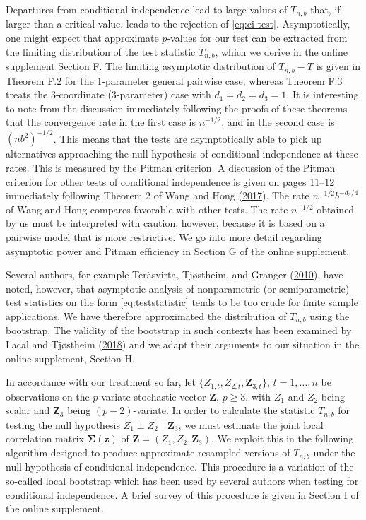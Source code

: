 \documentclass[
  12pt,
  letterpaper]{article}
\newcommand{\Z}{\bm{Z}}
\newcommand{\z}{\bm{z}}
\newcommand{\fSigma}{\bm{\Sigma}}
\theoremstyle{definition}
\theoremstyle{definition}
\theoremstyle{definition}
\theoremstyle{remark}
\begin{document}
Departures from conditional independence lead to large values of \(T_{n,b}\) that, if larger than a critical value, leads to the rejection of \eqref{eq:ci-test}. Asymptotically, one might expect that approximate \(p\)-values for our test can be extracted from the limiting distribution of the test statistic \(T_{n,b}\), which we derive in the online supplement Section F. The limiting asymptotic distribution of \(T_{n,b}-T\) is given in Theorem F.2 for the 1-parameter general pairwise case, whereas Theorem F.3 treats the 3-coordinate (3-parameter) case with \(d_1=d_2=d_3=1\). It is interesting to note from the discussion immediately following the proofs of these theorems that the convergence rate in the first case is \(n^{-1/2}\), and in the second case is \(\left(nb^2\right)^{-1/2}\). This means that the tests are asymptotically able to pick up alternatives approaching the null hypothesis of conditional independence at these rates. This is measured by the Pitman criterion. A discussion of the Pitman criterion for other tests of conditional independence is given on pages 11--12 immediately following Theorem 2 of Wang and Hong (\protect\hyperlink{ref-wang2017characteristic}{2017}). The rate \(n^{-1/2}b^{-d_3/4}\) of Wang and Hong compares favorable with other tests. The rate \(n^{-1/2}\) obtained by us must be interpreted with caution, however, because it is based on a pairwise model that is more restrictive. We go into more detail regarding asymptotic power and Pitman efficiency in Section G of the online supplement.

Several authors, for example Teräsvirta, Tjøstheim, and Granger (\protect\hyperlink{ref-terasvirta2010modelling}{2010}), have noted, however, that asymptotic analysis of nonparametric (or semiparametric) test statistics on the form \eqref{eq:teststatistic} tends to be too crude for finite sample applications. We have therefore approximated the distribution of \(T_{n,b}\) using the bootstrap. The validity of the bootstrap in such contexts has been examined by Lacal and Tjøstheim (\protect\hyperlink{ref-lacal2018estimating}{2018}) and we adapt their arguments to our situation in the online supplement, Section H.

In accordance with our treatment so far, let \(\{Z_{1,t}, Z_{2, t}, \Z_{3, t}\}\), \(t = 1,\ldots,n\) be observations on the \(p\)-variate stochastic vector \(\Z\), \(p\geq3\), with \(Z_1\) and \(Z_2\) being scalar and \(\Z_3\) being \((p-2)\)-variate. In order to calculate the statistic \(T_{n,b}\) for testing the null hypothesis \(Z_1 \perp Z_2 \,\,|\,\, \Z_3\), we must estimate the joint local correlation matrix \(\fSigma(\z)\) of \(\Z = (Z_1, Z_2, \Z_3)\). We exploit this in the following algorithm designed to produce approximate resampled versions of \(T_{n,b}\) under the null hypothesis of conditional independence. This procedure is a variation of the so-called local bootstrap which has been used by several authors when testing for conditional independence. A brief survey of this procedure is given in Section I of the online supplement.
\end{document}
